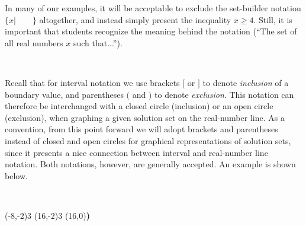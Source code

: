 In many of our examples, it will be acceptable to exclude the set-builder notation $\{x|\qquad\}$ altogether, and instead simply present the inequality $x\geq 4$.  Still, it is important that students recognize the meaning behind the notation (``The set of all real numbers $x$ such that...'').\par
~\par
Recall that for interval notation we use brackets $[$ or $]$ to denote \textit{inclusion} of a boundary value, and parentheses $($ and $)$ to denote \textit{exclusion}.  This notation can therefore be interchanged with a closed circle (inclusion) or an open circle (exclusion), when graphing a given solution set on the real-number line.  As a convention, from this point forward we will adopt brackets and parentheses instead of closed and open circles for graphical representations of solution sets, since it presents a nice connection between interval and real-number line notation.  Both notations, however, are generally accepted.  An example is shown below.

\pagebreak

\begin{example}\label{Lin93}
~\end{example}

\begin{center}
\begin{mfpic}[8]{-20}{20}{-2}{0}
\reverse \arrow {}
\tlpointsep{4pt}
\tlabel[cc](-8,-2){$3$}
\reverse \arrow {}
\tlpointsep{4pt}
\tlabel[cc](16,-2){$3$}
\tlabel[cc](16,0){{\Large\bf )}}
\penwd{2.3pt}
\arrow[b -5.8pt][l 6pt]
\arrow[b -5.8pt][l 6pt]
\end{mfpic} 
\end{center}


